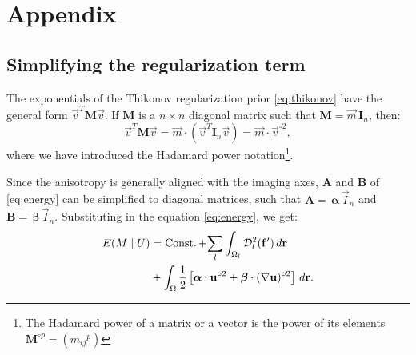 \renewcommand{\theequation}{A.\arabic{equation}}
\renewcommand{\thesubsection}{Appendix \arabic{subsection}}

\section*{Appendix}

\subsection{Simplifying the regularization term}\label{app:reg_term}
The exponentials of the Thikonov regularization prior \eqref{eq:thikonov} have the general form
  $\vec{v}^T \mathbf{M} \vec{v}$.
If $\mathbf{M}$ is a $n \times n$ diagonal matrix such that $\mathbf{M} = \vec{m} \, \mathbf{I}_n$, 
  then:
\begin{equation*}
\vec{v}^T \mathbf{M} \vec{v} = \vec{m} \cdot (\vec{v}^T \mathbf{I}_n \vec{v}) = \vec{m} \cdot \vec{v}^{\circ2},
\end{equation*}
%
  where we have introduced the Hadamard power notation\footnote{The Hadamard power of a matrix or a vector
  is the power of its elements $\mathbf{M}^{\circ p} = ({m_{ij}}^{p})$}.

Since the anisotropy is generally aligned with the imaging axes, 
  $\mathbf{A}$ and $\mathbf{B}$ of \eqref{eq:energy} can be simplified to diagonal matrices, such that
  $\mathbf{A}= \, \boldsymbol{\alpha}\,\vec{I}_n$ and
  $\mathbf{B}= \, \boldsymbol{\beta}\,\vec{I}_n$.
Substituting in the equation \eqref{eq:energy}, we get:
  \begin{align}
  E(M \mid U) &= \const + \underset{l}{\sum} \int_{\Omega_l}
  \mdist{f'}{l} \,d\vec{r} \notag\\
  &+ \int_{\Omega} \frac12 \left[ \boldsymbol{\alpha} \cdot \vec{u}^{\circ2} + \boldsymbol{\beta} \cdot (\nabla \vec{u})^{\circ2} \right] \,d\vec{r}.
  \label{eq:app_energy}
  \end{align}